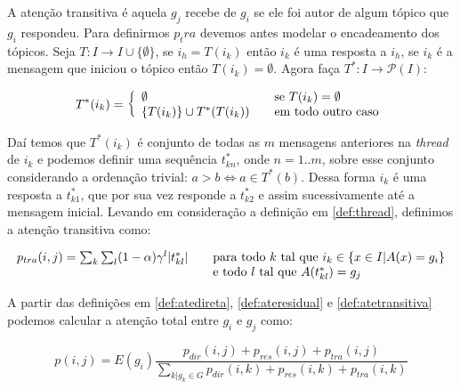 \documentclass{article}
\begin{document}
A atenção transitiva é aquela $g_j$ recebe de $g_i$ se ele foi autor de algum
tópico que $g_i$ respondeu. Para definirmos $p_tra$ devemos antes modelar o
encadeamento dos tópicos. Seja $T:I\to I\cup\{\emptyset\}$, se $i_h=T(i_k)$
então $i_k$ é uma resposta a $i_h$, se $i_k$ é a mensagem que iniciou o tópico
então $T(i_k)=\emptyset$. Agora faça $T^*:I\to\mathcal{P}(I)$:

\begin{equation}
\label{def:thread}
T^*(i_k) = \left\{ \begin{array}{l l} \emptyset &\quad\text{se
$T(i_k)=\emptyset$}\\ \{T(i_k)\} \cup T^*(T(i_k)) &\quad\text{em todo outro
caso}\end{array} \right.
\end{equation}

Daí temos que $T^*(i_k)$ é conjunto de todas as $m$ mensagens anteriores na
\textit{thread} de $i_k$ e podemos definir uma sequência $t^*_{kn}$, onde
$n=1..m$, sobre esse conjunto considerando a ordenação trivial: $a > b \iff a\in
T^*(b)$. Dessa forma $i_k$ é uma resposta a $t^*_{k1}$, que por sua vez responde
a $t^*_{k2}$ e assim sucessivamente até a mensagem inicial. Levando em
consideração a definição em \ref{def:thread}, definimos a atenção transitiva
como:

\begin{equation}
\label{def:atetransitiva}
\begin{array}{ l l }
p_{tra}(i,j) = \sum_k\sum_l
(1-\alpha)\gamma^l|t^*_{kl}| &\quad\text{para todo $k$ tal que $i_k \in \{x
\in I| A(x)=g_i\}$}\\&\quad\text{e todo $l$ tal que $A(t^*_{kl}) = g_j$}
\end{array}
\end{equation}

A partir das definições em \ref{def:atedireta}, \ref{def:ateresidual} e
\ref{def:atetransitiva} podemos calcular a atenção total entre $g_i$ e $g_j$
como:

\begin{equation}
\label{def:atetotal}
p(i,j) = E(g_i)\frac{p_{dir}(i,j) + p_{res}(i,j) + p_{tra}(i,j)}{\sum_{k|g_k \in
G}p_{dir}(i,k) + p_{res}(i,k) + p_{tra}(i,k)}
\end{equation}
\end{document}
